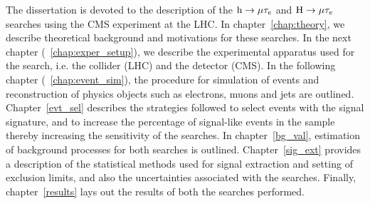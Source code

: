 The dissertation is devoted to the description of the $\text{h} \to \mu \tau_{e}$ and $\text{H} \to \mu \tau_{e}$ searches using the CMS experiment at the LHC. In chapter~\ref{chap:theory}, we describe theoretical background and motivations for these searches. In the next chapter (\!~\ref{chap:exper_setup}), we describe the experimental apparatus used for the search, i.e. the collider (LHC) and the detector (CMS). In the following chapter (\!~\ref{chap:event_sim}), the procedure for simulation of events and reconstruction of physics objects such as electrons, muons and jets are outlined. Chapter~\ref{evt_sel} describes the strategies followed to select events with the signal signature, and to increase the percentage of signal-like events in the sample thereby increasing the sensitivity of the searches. In chapter~\ref{bg_val}, estimation of background processes for both searches is outlined. Chapter~\ref{sig_ext} provides a description of the statistical methods used for signal extraction and setting of exclusion limits, and also the uncertainties associated with the searches. Finally, chapter~\ref{results} lays out the results of both the searches performed.    





